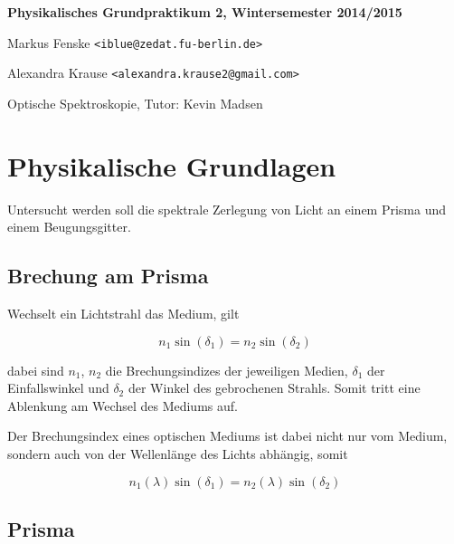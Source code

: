 \documentclass[a4paper,german,12pt,smallheadings]{scrartcl}
\begin{document}
\begin{titlepage}

\end{titlepage}

\allowdisplaybreaks %
\begin{center}
\bfseries %
\sffamily %
\vspace{-40pt}
Physikalisches Grundpraktikum 2, Wintersemester 2014/2015

Markus Fenske \texttt{<iblue@zedat.fu-berlin.de>}

Alexandra Krause \texttt{<alexandra.krause2@gmail.com>}

Optische Spektroskopie, Tutor: Kevin Madsen
\vspace{-10pt}
\end{center}

\section{Physikalische Grundlagen}

Untersucht werden soll die spektrale Zerlegung von Licht an einem Prisma und
einem Beugungsgitter.

\subsection{Brechung am Prisma}

Wechselt ein Lichtstrahl das Medium, gilt

\begin{equation}
  n_1 \sin(\delta_1) = n_2 \sin(\delta_2)
\end{equation}

dabei sind $n_1$, $n_2$ die Brechungsindizes der jeweiligen Medien, $\delta_1$
der Einfallswinkel und $\delta_2$ der Winkel des gebrochenen Strahls. Somit
tritt eine Ablenkung am Wechsel des Mediums auf.

Der Brechungsindex eines optischen Mediums ist dabei nicht nur vom Medium,
sondern auch von der Wellenlänge des Lichts abhängig, somit

\begin{equation}
  n_1(\lambda) \sin(\delta_1) = n_2(\lambda) \sin(\delta_2)
\end{equation}

\subsection{Prisma}
\end{document}
